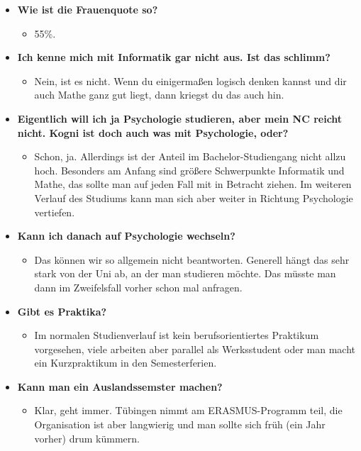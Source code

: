\begin{large}
\begin{itemize}
	\item \textbf{Wie ist die Frauenquote so?}
	\begin{itemize}
		\item 55\%.
	\end{itemize}



	\item \textbf{Ich kenne mich mit Informatik gar nicht aus. Ist das schlimm?}
	\begin{itemize}
		\item Nein, ist es nicht. Wenn du einigermaßen logisch denken kannst und dir auch Mathe ganz gut liegt, dann kriegst du das auch hin.
	\end{itemize}



	\item \textbf{Eigentlich will ich ja Psychologie studieren, aber mein NC reicht nicht. Kogni ist doch auch was mit Psychologie, oder?}
	\begin{itemize}
		\item Schon, ja. Allerdings ist der Anteil im Bachelor-Studiengang nicht allzu hoch. Besonders am Anfang sind größere Schwerpunkte Informatik und Mathe, das sollte man auf jeden Fall mit in Betracht ziehen. Im weiteren Verlauf des Studiums kann man sich aber weiter in Richtung Psychologie vertiefen.
	\end{itemize}



	\item \textbf{Kann ich danach auf Psychologie wechseln?}
	\begin{itemize}
		\item Das können wir so allgemein nicht beantworten. Generell hängt das sehr stark von der Uni ab, an der man studieren möchte. Das müsste man dann im Zweifelsfall vorher schon mal anfragen.
	\end{itemize}


	\item \textbf{Gibt es Praktika?}
	\begin{itemize}
		\item Im normalen Studienverlauf ist kein berufsorientiertes Praktikum vorgesehen, viele arbeiten aber parallel als Werksstudent oder man macht ein Kurzpraktikum in den Semesterferien.
	\end{itemize}



	\item \textbf{Kann man ein Auslandssemster machen?}
	\begin{itemize}
		\item  Klar, geht immer. Tübingen nimmt am ERASMUS-Programm teil, die Organisation ist aber langwierig und man sollte sich früh (ein Jahr vorher) drum kümmern.
	\end{itemize}




\end{itemize}
\end{large}
